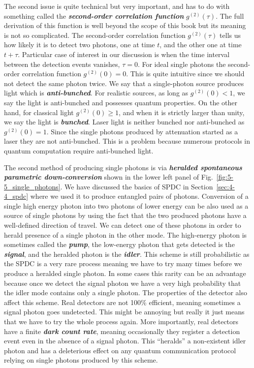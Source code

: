 The second issue is quite technical but very important, and has to do with something called the \textit{\textbf{second-order correlation function}} $g^{(2)}(\tau)$.
The full derivation of this function is well beyond the scope of this book but its meaning is not so complicated.
The second-order correlation function $g^{(2)}(\tau)$ tells us how likely it is to detect two photons, one at time $t$, and the other one at time $t+\tau$.
Particular case of interest in our discussion is when the time interval between the detection events vanishes, $\tau = 0$.
For ideal single photons the second-order correlation function $g^{(2)}(0) = 0$.
This is quite intuitive since we should not detect the same photon twice.
We say that a single-photon source produces light which is \textit{\textbf{anti-bunched}}.
For realistic sources, as long as $g^{(2)}(0) < 1$, we say the light is anti-bunched and possesses quantum properties.
On the other hand, for classical light $g^{(2)}(0) \geq 1$, and when it is strictly larger than unity, we say the light is \textit{\textbf{bunched}}.
Laser light is neither bunched nor anti-bunched as $g^{(2)}(0)=1$.
Since the single photons produced by attenuation started as a laser they are not anti-bunched.
This is a problem because numerous protocols in quantum computation require anti-bunched light.

The second method of producing single photons is via \textit{\textbf{heralded spontaneous parametric down-conversion}} shown in the lower left panel of Fig.~\ref{fig:5-5_single_photons}.
We have discussed the basics of SPDC in Section~\ref{sec:4-4_spdc} where we used it to produce entangled pairs of photons.
Conversion of a single high energy photon into two photons of lower energy can be also used as a source of single photons by using the fact that the two produced photons have a well-defined direction of travel.
We can detect one of these photons in order to herald presence of a single photon in the other mode.
The high-energy photon is sometimes called the \textit{\textbf{pump}}, the low-energy photon that gets detected is the \textit{\textbf{signal}}, and the heralded photon is the \textit{\textbf{idler}}.
This scheme is still probabilistic as the SPDC is a very rare process meaning we have to try many times before we produce a heralded single photon.
In some cases this rarity can be an advantage because once we detect the signal photon we have a very high probability that the idler mode contains only a single photon.
The properties of the detector also affect this scheme.
Real detectors are not 100\% efficient, meaning sometimes a signal photon goes undetected.
This might be annoying but really it just means that we have to try the whole process again.
More importantly, real detectors have a finite \textit{\textbf{dark count rate}}, meaning occasionally they register a detection event even in the absence of a signal photon.
This ``heralds'' a non-existent idler photon and has a deleterious effect on any quantum communication protocol relying on single photons produced by this scheme.

